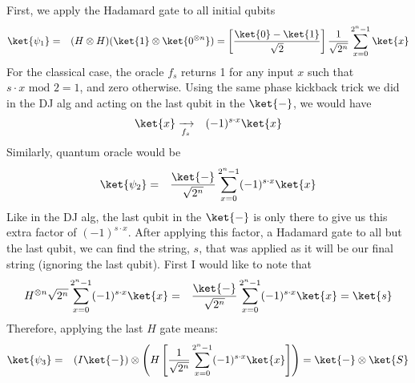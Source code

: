 \documentclass[preprint,aps,prd,nofootinbib,superscriptaddress]{revtex4-2}
\begin{document}
First, we apply the Hadamard gate to all initial qubits
%
\begin{eqnarray}
\ket{\psi_1} &=& (H \otimes H)(\ket{1} \otimes \ket{0^{\otimes n}}) = \left[\frac{\ket{0} - \ket{1}}{\sqrt{2}}\right] \frac{1}{\sqrt{2^n}} \sum \limits_{x=0}^{2^n - 1}\ket{x}
\end{eqnarray}
%
For the classical case, the oracle $f_s$ returns 1 for any input $x$ such that $s \cdot x \text{ mod } 2=1$, and zero otherwise. Using the same phase kickback trick we did in the DJ alg and acting on the last qubit in the $\ket{-}$, we would have
%
\begin{eqnarray}
\ket{x} &\xrightarrow[f_s]{} & (-1)^{s \cdot x} \ket{x}
\end{eqnarray}
%
Similarly, quantum oracle would be
%
\begin{eqnarray}
\ket{\psi_2} &=& \frac{\ket{-}}{\sqrt{2^n}} \sum \limits_{x=0}^{2^n - 1}(-1)^{s \cdot x} \ket{x}
\end{eqnarray}
%
Like in the DJ alg, the last qubit in the $\ket{-}$ is only there to give us this extra factor of $(-1)^{s \cdot x}$. After applying this factor, a Hadamard gate to all but the last qubit, we can find the string, $s$, that was applied as it will be our final string (ignoring the last qubit). First I would like to note that 
%
\begin{eqnarray}
H^{\otimes n} {\sqrt{2^n}} \sum \limits_{x=0}^{2^n - 1}(-1)^{s \cdot x} \ket{x} &=& \frac{\ket{-}}{\sqrt{2^n}} \sum \limits_{x=0}^{2^n - 1}(-1)^{s \cdot x} \ket{x} = \ket{s}
\end{eqnarray}
%
Therefore, applying the last $H$ gate means:
%
\begin{eqnarray}
\ket{\psi_3} &=& \left(I \ket{-}\right)\otimes \left(H \left[\frac{1}{\sqrt{2^n}} \sum \limits_{x=0}^{2^n - 1}(-1)^{s \cdot x} \ket{x} \right]\right) = \ket{-}\otimes\ket{S}
\end{eqnarray}
%



\begin{thebibliography}{99}



\end{thebibliography}
\end{document}
